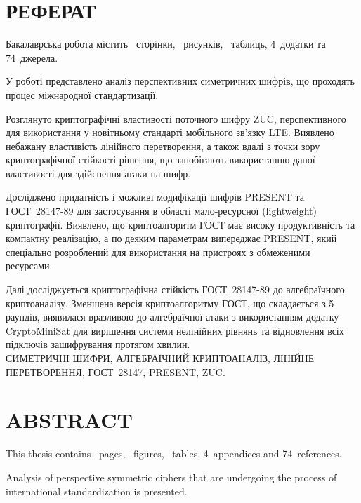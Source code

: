 %
%

\newpage
{}
\chapter*{РЕФЕРАТ}
    Бакалаврська робота містить ~сторінки,
    \totalfigures~рисунків,
    \totaltables~таблиць, 4~додатки та 74~джерела.

    У роботі представлено аналіз перспективних симетричних шифрів, що проходять процес
    міжнародної стандартизації.

    Розглянуто криптографічні властивості поточного шифру ZUC, перспективного
    для використання у новітньому стандарті мобільного зв'язку LTE. Виявлено
    небажану властивість лінійного перетворення,
    а також вдалі з точки зору криптографічної стійкості рішення, що
    запобігають використанню даної властивості для здійснення атаки на шифр.

    Досліджено придатність і можливі модифікації шифрів PRESENT та
    ГОСТ~28147-89 для застосування в області мало-ресурсної (lightweight)
    криптографії. Виявлено, що криптоалгоритм ГОСТ має високу продуктивність та
    компактну реалізацію, а по деяким параметрам випереджає PRESENT, який
    спеціально розроблений для використання на пристроях з обмеженими
    ресурсами.

    Далі досліджується криптографічна стійкість ГОСТ~28147-89 до алгебраїчного
    криптоаналізу. Зменшена версія криптоалгоритму ГОСТ, що складається з 5
    раундів, виявилася вразливою до алгебраїчної атаки з використанням
    додатку CryptoMiniSat для вирішення системи нелінійних рівнянь та
    відновлення всіх підключів зашифрування протягом хвилин. \\[1em]

    СИМЕТРИЧНІ ШИФРИ, АЛГЕБРАЇЧНИЙ КРИПТОАНАЛІЗ, ЛІНІЙНЕ ПЕРЕТВОРЕННЯ,
    ГОСТ~28147, PRESENT, ZUC.

\newpage
\chapter*{ABSTRACT}
This thesis contains ~pages, \totalfigures~figures, \totaltables~tables,
    4~appendices and 74~references.

    Analysis of perspective symmetric ciphers that are
    undergoing the process of international standardization is presented.

